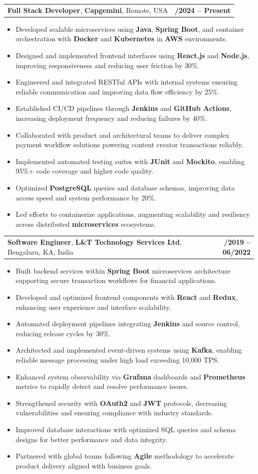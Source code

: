 \documentclass[letterpaper,11pt]{article}
\makeatletter
\newcommand{\resumeItem}[1]{
  \item\footnotesize{
    {#1 \vspace{-2pt}}
  }
}
\newcommand{\resumeSubheading}[4]{
  \vspace{-2pt}\item
    \begin{tabular*}{1.0\textwidth}[t]{l@{\extracolsep{\fill}}r}
      \textbf{\fontsize{10pt}{14pt}\selectfont #3}, \textbf{\fontsize{10pt}{14pt}\selectfont #1}, \fontsize{10pt}{14pt}\selectfont #4 & \textbf{\fontsize{10pt}{14pt}\selectfont #2} \\
    \end{tabular*}\vspace{-7pt}
}
\newcommand{\resumeItemListStart}{\begin{itemize}[leftmargin=*]}
\newcommand{\resumeItemListEnd}{\end{itemize}\vspace{-5pt}}
\makeatother
\begin{document}
    \resumeSubheading
        {Capgemini}{01/2024 -- Present}
        {Full Stack Developer}{Remote, USA}
      \resumeItemListStart
        \resumeItem{Developed scalable microservices using \textbf{Java}, \textbf{Spring Boot}, and container orchestration with \textbf{Docker} and \textbf{Kubernetes} in \textbf{AWS} environments.}
        \resumeItem{Designed and implemented frontend interfaces using \textbf{React.js} and \textbf{Node.js}, improving responsiveness and reducing user friction by 30\%.}
        \resumeItem{Engineered and integrated RESTful APIs with internal systems ensuring reliable communication and improving data flow efficiency by 25\%.}
        \resumeItem{Established CI/CD pipelines through \textbf{Jenkins} and \textbf{GitHub Actions}, increasing deployment frequency and reducing failures by 40\%.}
        \resumeItem{Collaborated with product and architectural teams to deliver complex payment workflow solutions powering content creator transactions reliably.}
        \resumeItem{Implemented automated testing suites with \textbf{JUnit} and \textbf{Mockito}, enabling 95\%+ code coverage and higher code quality.}
        \resumeItem{Optimized \textbf{PostgreSQL} queries and database schemas, improving data access speed and system performance by 20\%.}
        \resumeItem{Led efforts to containerize applications, augmenting scalability and resiliency across distributed \textbf{microservices} ecosystems.}
      \resumeItemListEnd

    \resumeSubheading
        {L\&T Technology Services Ltd}{08/2019 -- 06/2022}
        {Software Engineer}{Bengaluru, KA, India}
      \resumeItemListStart
        \resumeItem{Built backend services within \textbf{Spring Boot} microservices architecture supporting secure transaction workflows for financial applications.}
        \resumeItem{Developed and optimized frontend components with \textbf{React} and \textbf{Redux}, enhancing user experience and interface scalability.}
        \resumeItem{Automated deployment pipelines integrating \textbf{Jenkins} and source control, reducing release cycles by 30\%.}
        \resumeItem{Architected and implemented event-driven systems using \textbf{Kafka}, enabling reliable message processing under high load exceeding 10,000 TPS.}
        \resumeItem{Enhanced system observability via \textbf{Grafana} dashboards and \textbf{Prometheus} metrics to rapidly detect and resolve performance issues.}
        \resumeItem{Strengthened security with \textbf{OAuth2} and \textbf{JWT} protocols, decreasing vulnerabilities and ensuring compliance with industry standards.}
        \resumeItem{Improved database interactions with optimized SQL queries and schema designs for better performance and data integrity.}
        \resumeItem{Partnered with global teams following \textbf{Agile} methodology to accelerate product delivery aligned with business goals.}
      \resumeItemListEnd
\end{document}
